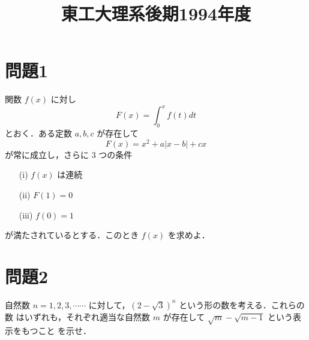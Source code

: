 \documentclass[unicode,12pt, a4paper]{ltjsarticle}%
\title{東工大理系後期1994年度}
\begin{document}
\maketitle
\section{問題1}
関数 $f(x)$ に対し
\[ F(x) = \int_0^x f(t)dt \]
とおく．ある定数 $a, b, c$ が存在して
\[ F(x) = x^2 + a|x-b| + cx \]
が常に成立し，さらに $3$ つの条件
\begin{enumerate}
    \item[(i)] $f(x)$ は連続
    \item[(ii)] $F(1) = 0$
    \item[(iii)] $f(0) = 1$
\end{enumerate}
が満たされているとする．このとき $f(x)$ を求めよ．


\section{問題2}
自然数 $n=1,2,3,\cdots\cdots$ に対して，$(2-\sqrt{3})^n$ という形の数を考える．これらの数
はいずれも，それぞれ適当な自然数 $m$ が存在して $\sqrt{m}-\sqrt{m-1}$ という表示をもつこと
を示せ．
\end{document}
